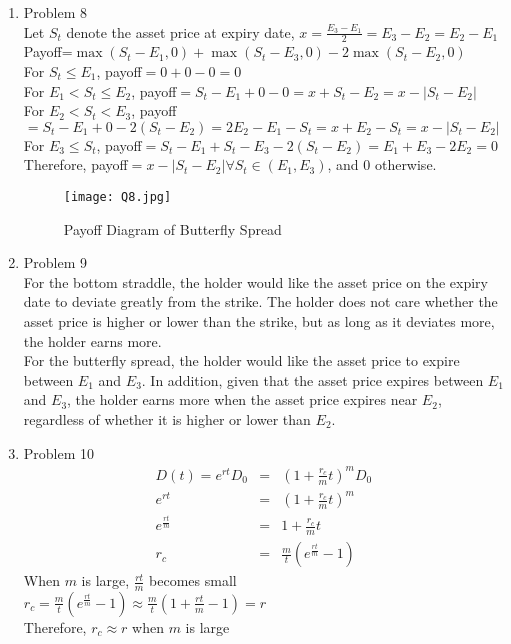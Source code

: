 \documentclass[leqno,12pt]{article}
\begin{document}
\begin{enumerate}
\pagebreak

\item Problem 8\\
Let $S_t$ denote the asset price at expiry date, $x=\frac{E_3-E_1}{2}=E_3-E_2=E_2-E_1$\\
Payoff=$\max(S_t-E_1,0)+\max(S_t-E_3,0)-2\max(S_t-E_2,0)$\\
For $S_t\leq E_1$, payoff$=0+0-0=0$\\
For $E_1<S_t\leq E_2$, payoff$=S_t-E_1+0-0=x+S_t-E_2=x-|S_t-E_2|$\\
For $E_2<S_t<E_3$, payoff$=S_t-E_1+0-2(S_t-E_2)=2E_2-E_1-S_t=x+E_2-S_t=x-|S_t-E_2|$\\
For $E_3\leq S_t$, payoff$=S_t-E_1+S_t-E_3-2(S_t-E_2)=E_1+E_3-2E_2=0$\\
Therefore, payoff$=x-|S_t-E_2|\forall S_t\in(E_1,E_3)$, and 0 otherwise.
\begin{figure}[ht]
\centering
\texttt{[image: Q8.jpg]}
\caption{\label{fig:Q8}Payoff Diagram of Butterfly Spread}
\end{figure}

\pagebreak

\item Problem 9\\
For the bottom straddle, the holder would like the asset price on the expiry date to deviate greatly from the strike. The holder does not care whether the asset price is higher or lower than the strike, but as long as it deviates more, the holder earns more.\\
For the butterfly spread, the holder would like the asset price to expire between $E_1$ and $E_3$. In addition, given that the asset price expires between $E_1$ and $E_3$, the holder earns more when the asset price expires near $E_2$, regardless of whether it is higher or lower than $E_2$.\\

\pagebreak

\item Problem 10
\begin{eqnarray*}
D(t)=e^{rt}D_0&=&\left(1+\frac{r_c}{m}t\right)^mD_0\\
e^{rt}&=&\left(1+\frac{r_c}{m}t\right)^m\\
e^{\frac{rt}{m}}&=&1+\frac{r_c}{m}t\\
r_c&=&\frac{m}{t}\left(e^{\frac{rt}{m}}-1\right)
\end{eqnarray*}
When $m$ is large, $\frac{rt}{m}$ becomes small\\
$r_c=\frac{m}{t}\left(e^{\frac{rt}{m}}-1\right)\approx\frac{m}{t}\left(1+\frac{rt}{m}-1\right)=r$\\
Therefore, $r_c\approx r$ when $m$ is large


\end{enumerate}
\end{document}

